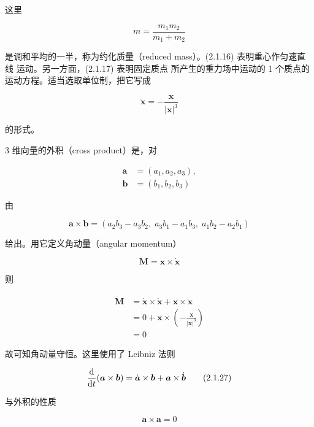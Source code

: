 这里

\begin{equation}
  m = \frac{m_1m_2}{m_1 + m_2}
  \tag{2.1.18}
\end{equation}

是调和平均的一半，称为约化质量（reduced mass）。(2.1.16) 表明重心作匀速直线
运动。另一方面，(2.1.17) 表明固定质点
所产生的重力场中运动的 1 个质点的运动方程。适当选取单位制，把它写成

\begin{equation}
  \ddot{\bm{x}} = -\frac{\bm{x}}{|\bm{x}|^3}
  \tag{2.1.19}
\end{equation}

的形式。

3 维向量的外积（cross product）是，对

\begin{align}
  \bm{a} &= (a_1, a_2, a_3), \tag{2.1.20}\\
  \bm{b} &= (b_1, b_2, b_3) \tag{2.1.21}
\end{align}

由

\begin{equation}
  \bm{a}\times\bm{b}
    = (a_2b_3 - a_3b_2,\; a_3b_1 - a_1b_3,\; a_1b_2 - a_2b_1)
  \tag{2.1.22}
\end{equation}

给出。用它定义角动量（angular momentum）

\begin{equation}
  \bm{M} = \bm{x}\times\dot{\bm{x}}
  \tag{2.1.23}
\end{equation}

则

\begin{align}
  \dot{\bm{M}} &= \dot{\bm{x}}\times\dot{\bm{x}}
    + \bm{x}\times\ddot{\bm{x}} \tag{2.1.24}\\
  &= 0 + \bm{x}\times\left(-\frac{\bm{x}}{|\bm{x}|^3}\right) \tag{2.1.25}\\
  &= 0 \tag{2.1.26}
\end{align}

故可知角动量守恒。这里使用了 Leibniz 法则

\begin{equation}
  \frac{\mathrm{d}}{\mathrm{d} t}(\bm{a}\times\bm{b})
    = \dot{\bm{a}}\times\bm{b} + \bm{a}\times\dot{\bm{b}}
  \tag{2.1.27}
\end{equation}

与外积的性质

\begin{equation}
  \bm{a}\times\bm{a} = 0
  \tag{2.1.28}
\end{equation}

